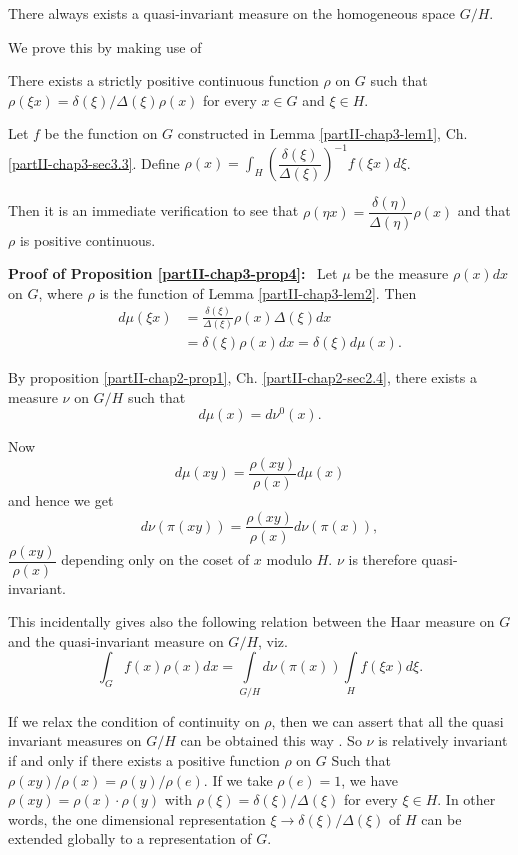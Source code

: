 \begin{proposition}\label{partII-chap3-prop4}%
There always exists a quasi-invariant measure on the homogeneous space
$G/H$. 
\end{proposition}

We prove this by making use of

\begin{lem}\label{partII-chap3-lem2}%
There exists a strictly positive continuous function $\rho$ on $G$
such that $\rho (\xi x) =\delta (\xi)/\Delta  (\xi)\rho(x)$ for
every $x\in G$ and $\xi \in H$. 
\end{lem}

Let $f$ be the function on $G$ constructed in Lemma \ref{partII-chap3-lem1},
Ch. \ref{partII-chap3-sec3.3}. Define 
$\rho (x)=\int_H \left( \dfrac{\delta(\xi)} {\Delta 
(\xi)}\right)^{-1}f(\xi x) d \xi$. 

Then it is an immediate verification to see that $\rho (\eta
x)=\dfrac{\delta (\eta)} {\Delta  (\eta)} \rho(x)$ and that $\rho$
is positive continuous. 

\medskip
\noindent
{\bf Proof of Proposition \ref{partII-chap3-prop4}:}~
Let $\mu$ be the measure $\rho (x)dx$ on $G$, where $\rho$ is the
function of Lemma \ref{partII-chap3-lem2}. Then 
\begin{align*}
d\mu (\xi x)&=\frac{\delta(\xi)}{\Delta(\xi)} \rho (x) \Delta 
(\xi) dx\\ 
&=\delta (\xi) \rho (x) dx=\delta (\xi) d \mu (x).
\end{align*}

By proposition \ref{partII-chap2-prop1},
Ch. \ref{partII-chap2-sec2.4}, there exists a 
measure $\nu$ on $G/H$ 
such that  
$$
d\mu(x)=d \nu^0(x).
$$

Now\pageoriginale
$$
d\mu(xy)=\frac {\rho (xy)}{\rho (x)} d\mu (x)
$$
and hence we get
$$
d \nu (\pi(xy))=\frac{\rho (xy)} {\rho (x)} d \nu (\pi (x)), 
$$ 
$\dfrac{\rho(xy)}{\rho (x)}$ depending only on the coset of $x$
modulo $H$. $\nu$ is therefore quasi-invariant. 

This incidentally gives also the following relation between the Haar
measure on $G$ and the quasi-invariant measure on $G/H$, viz. 
$$
\int_{G} f(x)\rho (x) dx= \int\limits_{G/H} d \nu (\pi (x))
\int\limits_{H} f(\xi x) d \xi.  
$$

If we relax the condition of continuity on $\rho$, then we can assert
that all the quasi invariant measures on $G/H$ can be obtained this
way \cite{key6}. So $\nu$ is relatively invariant if and only if there exists
a positive function $\rho$ on $G$ Such that  $\rho (xy)/\rho(x)=\rho
(y)/\rho (e)$. If we take  $\rho (e)=1$, we have $\rho
(xy)=\rho(x)\cdot \rho (y)$ with $\rho (\xi)=\delta (\xi)/\Delta 
(\xi) $ for every $\xi \in H$. In other words, the one dimensional
representation $\xi \rightarrow \delta (\xi)/ \Delta (\xi)$ of $H$
can be extended globally to a representation of $G$. 

